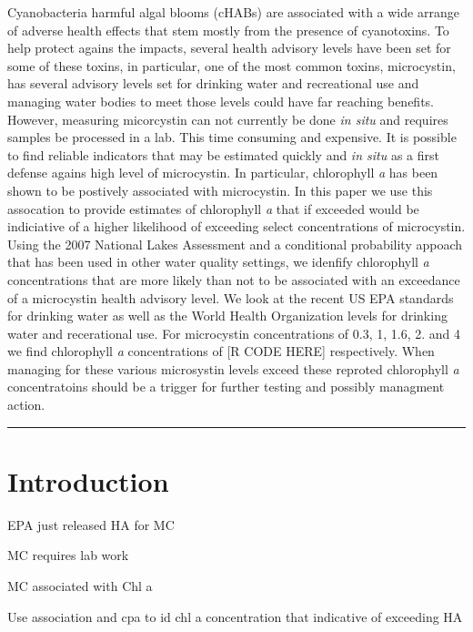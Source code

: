 \documentclass[11pt,]{article}
\begin{document}
Cyanobacteria harmful algal blooms (cHABs) are associated with a wide
arrange of adverse health effects that stem mostly from the presence of
cyanotoxins. To help protect agains the impacts, several health advisory
levels have been set for some of these toxins, in particular, one of the
most common toxins, microcystin, has several advisory levels set for
drinking water and recreational use and managing water bodies to meet
those levels could have far reaching benefits. However, measuring
micorcystin can not currently be done \emph{in situ} and requires
samples be processed in a lab. This time consuming and expensive. It is
possible to find reliable indicators that may be estimated quickly and
\emph{in situ} as a first defense agains high level of microcystin. In
particular, chlorophyll \emph{a} has been shown to be postively
associated with microcystin. In this paper we use this assocation to
provide estimates of chlorophyll \emph{a} that if exceeded would be
indiciative of a higher likelihood of exceeding select concentrations of
microcystin. Using the 2007 National Lakes Assessment and a conditional
probability appoach that has been used in other water quality settings,
we idenfify chlorophyll \emph{a} concentrations that are more likely
than not to be associated with an exceedance of a microcystin health
advisory level. We look at the recent US EPA standards for drinking
water as well as the World Health Organization levels for drinking water
and recerational use. For microcystin concentrations of 0.3, 1, 1.6, 2.
and 4 we find chlorophyll \emph{a} concentrations of {[}R CODE HERE{]}
respectively. When managing for these various microsystin levels exceed
these reproted chlorophyll \emph{a} concentratoins should be a trigger
for further testing and possibly managment action.

\vspace{3mm}

\hrule

\doublespace

\section{Introduction}\label{introduction}

EPA just released HA for MC

MC requires lab work

MC associated with Chl a

Use association and cpa to id chl a concentration that indicative of
exceeding HA
\end{document}
